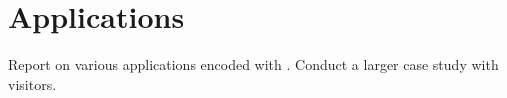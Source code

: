 \section{Applications}

Report on various applications encoded with \name. Conduct a larger case study with visitors. 